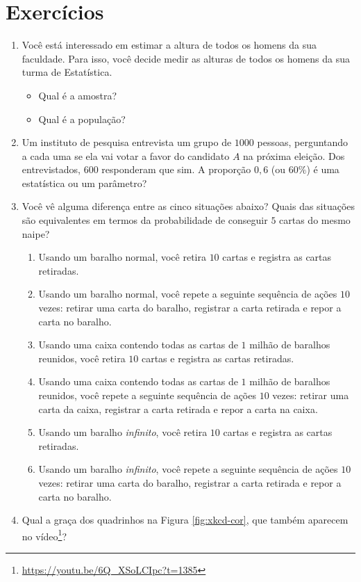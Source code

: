 \documentclass[
  11pt]{report}
\DeclareRobustCommand{\href}[2]{#2\footnote{\url{#1}}}
\providecommand{\tightlist}{%
  \setlength{\itemsep}{0pt}\setlength{\parskip}{0pt}}
\begin{document}
\hypertarget{exercuxedcios}{%
\section{Exercícios}\label{exercuxedcios}}

\begin{enumerate}
\def\labelenumi{\arabic{enumi}.}
\item
  Você está interessado em estimar a altura de todos os homens da sua faculdade. Para isso, você decide medir as alturas de todos os homens da sua turma de Estatística.

  \begin{itemize}
  \tightlist
  \item
    Qual é a amostra?
  \item
    Qual é a população?
  \end{itemize}
\item
  Um instituto de pesquisa entrevista um grupo de \(1000\) pessoas, perguntando a cada uma se ela vai votar a favor do candidato \(A\) na próxima eleição. Dos entrevistados, \(600\) responderam que sim. A proporção \(0{,}6\) (ou \(60\%\)) é uma estatística ou um parâmetro?
\item
  Você vê alguma diferença entre as cinco situações abaixo? Quais das situações são equivalentes em termos da probabilidade de conseguir \(5\) cartas do mesmo naipe?

  \begin{enumerate}
  \def\labelenumii{\alph{enumii}.}
  \item
    Usando um baralho normal, você retira \(10\) cartas e registra as cartas retiradas.
  \item
    Usando um baralho normal, você repete a seguinte sequência de ações \(10\) vezes: retirar uma carta do baralho, registrar a carta retirada e repor a carta no baralho.
  \item
    Usando uma caixa contendo todas as cartas de \(1\) milhão de baralhos reunidos, você retira \(10\) cartas e registra as cartas retiradas.
  \item
    Usando uma caixa contendo todas as cartas de \(1\) milhão de baralhos reunidos, você repete a seguinte sequência de ações \(10\) vezes: retirar uma carta da caixa, registrar a carta retirada e repor a carta na caixa.
  \item
    Usando um baralho \emph{infinito}, você retira \(10\) cartas e registra as cartas retiradas.
  \item
    Usando um baralho \emph{infinito}, você repete a seguinte sequência de ações \(10\) vezes: retirar uma carta do baralho, registrar a carta retirada e repor a carta no baralho.
  \end{enumerate}
\item
  Qual a graça dos quadrinhos na Figura \ref{fig:xkcd-cor}, que também \href{https://youtu.be/6Q_XSoLCIpc?t=1385}{aparecem no vídeo}?


\end{enumerate}
\end{document}
